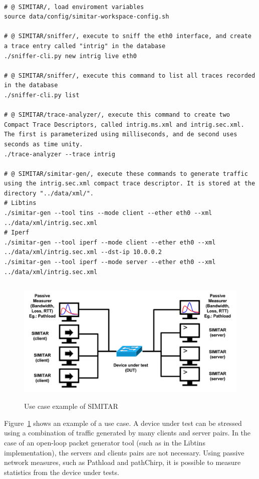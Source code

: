 \begin{verbatim}

# @ SIMITAR/, load enviroment variables
source data/config/simitar-workspace-config.sh

# @ SIMITAR/sniffer/, execute to sniff the eth0 interface, and create a trace entry called "intrig" in the database
./sniffer-cli.py new intrig live eth0

# @ SIMITAR/sniffer/, execute this command to list all traces recorded in the database
./sniffer-cli.py list

# @ SIMITAR/trace-analyzer/, execute this command to create two Compact Trace Descriptors, called intrig.ms.xml and intrig.sec.xml. The first is parameterized using milliseconds, and de second uses seconds as time unity.
./trace-analyzer --trace intrig

# @ SIMITAR/simitar-gen/, execute these commands to generate traffic using the intrig.sec.xml compact trace descriptor. It is stored at the directory "../data/xml/". 
# Libtins
./simitar-gen --tool tins --mode client --ether eth0 --xml ../data/xml/intrig.sec.xml 
# Iperf
./simitar-gen --tool iperf --mode client --ether eth0 --xml ../data/xml/intrig.sec.xml --dst-ip 10.0.0.2
./simitar-gen --tool iperf --mode server --ether eth0 --xml ../data/xml/intrig.sec.xml

\end{verbatim}


\begin{figure}[ht!]
    \centering
    \includegraphics[height=2.4in]{figures/ch3/use-case}
    \caption{Use case example of SIMITAR}
    \label{fig:use-case}
\end{figure}



Figure~\ref{fig:use-case} shows an example of a use case. A device under test can be stressed using a combination of traffic generated by many clients and server pairs. In the case of an open-loop packet generator tool (such as in the Libtins implementation), the servers and clients pairs are not necessary. Using passive network measures, such as Pathload\cite{web-pathload} and pathChirp\cite{swing-paper}\cite{web-pathchirp}, it is possible to measure statistics from the device under tests.
